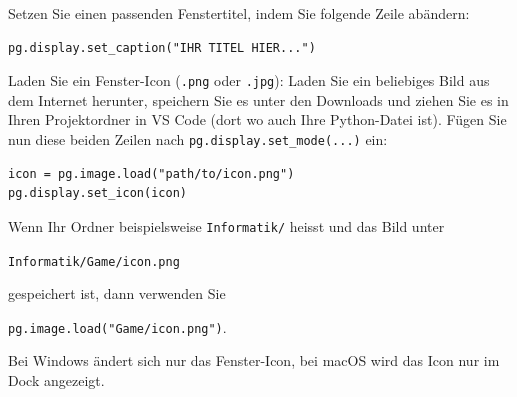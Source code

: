 \begin{myexercise}
    Setzen Sie einen passenden Fenstertitel, indem Sie folgende Zeile abändern:

    \begin{lstlisting}
pg.display.set_caption("IHR TITEL HIER...")
\end{lstlisting}
\end{myexercise}

\begin{mychallenge}
    Laden Sie ein Fenster-Icon (\texttt{.png} oder \texttt{.jpg}):
    Laden Sie ein beliebiges Bild aus dem Internet herunter, speichern Sie es unter den Downloads und ziehen Sie es in Ihren Projektordner in VS Code (dort wo auch Ihre Python-Datei ist). Fügen Sie nun diese beiden Zeilen nach \lstinline|pg.display.set_mode(...)| ein:

    \begin{lstlisting}
icon = pg.image.load("path/to/icon.png")
pg.display.set_icon(icon)
\end{lstlisting}

    Wenn Ihr Ordner beispielsweise \texttt{Informatik/} heisst und das Bild unter
    \begin{center}
    \texttt{Informatik/Game/icon.png}
    \end{center}
    gespeichert ist, dann verwenden Sie
    \begin{center}
            \lstinline|pg.image.load("Game/icon.png")|.
    \end{center}
    Bei Windows ändert sich nur das Fenster-Icon, bei macOS wird das Icon nur im Dock angezeigt.
    \begin{myanswer}
        
    \end{myanswer}
\end{mychallenge}

